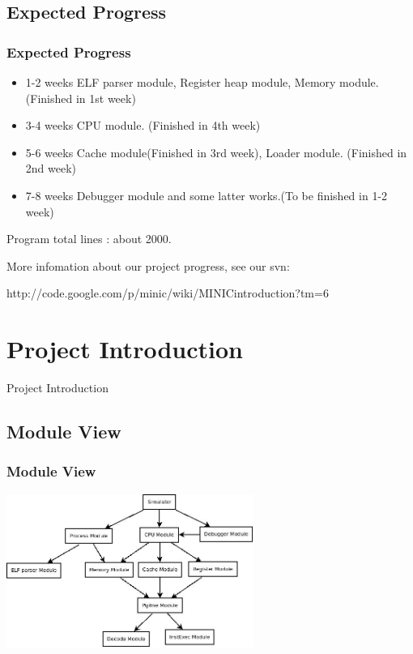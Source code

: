 \documentclass[CJK]{beamer}
\begin{document}
\begin{CJK}{UTF8}{gbsn}
\subsection{Expected Progress}
\begin{frame}
  \frametitle{Expected Progress}
  \begin{itemize}
    \item
      {\color{blue}1-2 weeks} ELF parser module, Register heap module, Memory module. {\color{red}(Finished in 1st week)}
    \item
      {\color{blue}3-4 weeks} CPU module. {\color{red}(Finished in 4th week)}
    \item
      {\color{blue}5-6 weeks} Cache module{\color{red}(Finished in 3rd week)}, Loader module. {\color{red}(Finished in 2nd week)}
    \item
      {\color{blue}7-8 weeks} Debugger module and some latter works.{\color{red}(To be finished in 1-2 week)}
  \end{itemize}
  Program total lines : about 2000.
  
  More infomation about our project progress, see our svn:

  {\color{blue}http://code.google.com/p/minic/wiki/MINICintroduction?tm=6}
\end{frame}

\section{Project Introduction}

\begin{frame}
  \huge{Project Introduction}
\end{frame}

\subsection{Module View}
\begin{frame}
  \frametitle{Module View}
  \includegraphics[height=5cm]{module_view.jpeg}
\end{frame}


\end{CJK}
\end{document}
